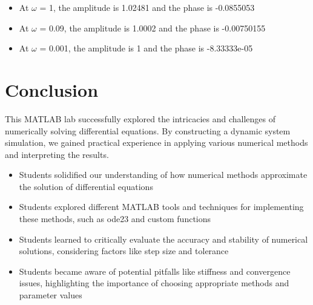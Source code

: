 \documentclass[12pt]{article}
\begin{document}
		\begin{itemize}
			\item At $\omega$ = 1, the amplitude is 1.02481 and the phase is -0.0855053
			\item At $\omega$ = 0.09, the amplitude is 1.0002 and the phase is -0.00750155
			\item At $\omega$ = 0.001, the amplitude is 1 and the phase is -8.33333e-05
		\end{itemize}
		
	\section{Conclusion}
	This MATLAB lab successfully explored the intricacies and challenges of numerically solving differential equations. By constructing a dynamic system simulation, we gained practical experience in applying various numerical methods and interpreting the results.
	
	\begin{itemize}
		\item Students solidified our understanding of how numerical methods approximate the solution of differential equations
		\item Students explored different MATLAB tools and techniques for implementing these methods, such as ode23 and custom functions
		\item Students learned to critically evaluate the accuracy and stability of numerical solutions, considering factors like step size and tolerance
		\item Students became aware of potential pitfalls like stiffness and convergence issues, highlighting the importance of choosing appropriate methods and parameter values
	\end{itemize}
	
\end{document}
